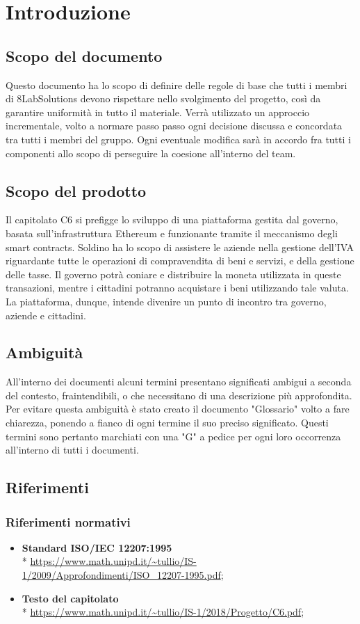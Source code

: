 \section{Introduzione}
\subsection{Scopo del documento}
Questo documento ha lo scopo di definire delle regole di base che tutti i membri di 8LabSolutions devono rispettare nello svolgimento del progetto, così da garantire uniformità in tutto il materiale. Verrà utilizzato un approccio incrementale, volto a normare passo passo ogni decisione discussa e concordata tra tutti i membri del gruppo. Ogni eventuale modifica sarà in accordo fra tutti i componenti allo scopo di perseguire la coesione all'interno del team.
\subsection{Scopo del prodotto}
Il capitolato C6 si prefigge lo sviluppo di una piattaforma gestita dal governo, basata sull'infrastruttura Ethereum e funzionante tramite il meccanismo degli smart contracts. Soldino ha lo scopo di assistere le aziende nella gestione dell'IVA riguardante tutte le operazioni di compravendita di beni e servizi, e della gestione delle tasse. Il governo potrà coniare e distribuire la moneta utilizzata in queste transazioni, mentre i cittadini potranno acquistare i beni utilizzando tale valuta. La piattaforma, dunque, intende divenire un punto di incontro tra governo, aziende e cittadini.
\subsection{Ambiguità}
All'interno dei documenti alcuni termini presentano significati ambigui  a  seconda del contesto, fraintendibili, o che necessitano di una descrizione più approfondita. Per evitare questa ambiguità è stato creato il documento "Glossario" volto a fare chiarezza, ponendo a fianco di ogni termine il suo preciso significato. Questi termini sono pertanto marchiati con una "G" a pedice per ogni loro occorrenza all'interno di tutti i documenti.
\subsection{Riferimenti}
\subsubsection{Riferimenti normativi}
\begin{itemize}
\item \textbf{Standard ISO/IEC 12207:1995} \\* 
\url{https://www.math.unipd.it/~tullio/IS-1/2009/Approfondimenti/ISO_12207-1995.pdf};
\item \textbf{Testo del capitolato} \\*  \url{https://www.math.unipd.it/~tullio/IS-1/2018/Progetto/C6.pdf};
\end{itemize}
